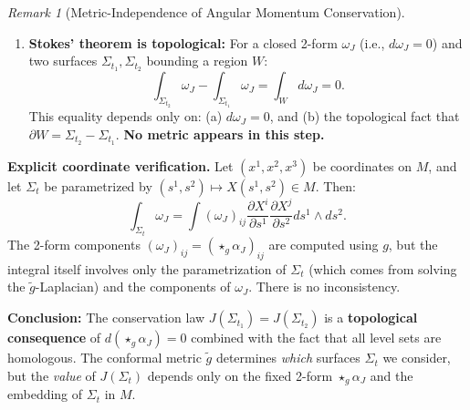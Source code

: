 \documentclass[12pt]{article}
\theoremstyle{plain}
\theoremstyle{definition}
\theoremstyle{remark}
\newtheorem{remark}[theorem]{Remark}
\begin{document}
\begin{remark}[Metric-Independence of Angular Momentum Conservation]
\begin{enumerate}
    \item \textbf{Stokes' theorem is topological:} For a closed 2-form $\omega_J$ (i.e., $d\omega_J = 0$) and two surfaces $\Sigma_{t_1}, \Sigma_{t_2}$ bounding a region $W$:
    \[
    \int_{\Sigma_{t_2}} \omega_J - \int_{\Sigma_{t_1}} \omega_J = \int_W d\omega_J = 0.
    \]
    This equality depends only on: (a) $d\omega_J = 0$, and (b) the topological fact that $\partial W = \Sigma_{t_2} - \Sigma_{t_1}$. \textbf{No metric appears in this step.}
\end{enumerate}

\textbf{Explicit coordinate verification.} Let $(x^1, x^2, x^3)$ be coordinates on $M$, and let $\Sigma_t$ be parametrized by $(s^1, s^2) \mapsto X(s^1, s^2) \in M$. Then:
\[
\int_{\Sigma_t} \omega_J = \int (\omega_J)_{ij} \frac{\partial X^i}{\partial s^1} \frac{\partial X^j}{\partial s^2} ds^1 \wedge ds^2.
\]
The 2-form components $(\omega_J)_{ij} = (\star_g \alpha_J)_{ij}$ are computed using $g$, but the integral itself involves only the parametrization of $\Sigma_t$ (which comes from solving the $\tilde{g}$-Laplacian) and the components of $\omega_J$. There is no inconsistency.

\textbf{Conclusion:} The conservation law $J(\Sigma_{t_1}) = J(\Sigma_{t_2})$ is a \textbf{topological consequence} of $d(\star_g \alpha_J) = 0$ combined with the fact that all level sets are homologous. The conformal metric $\tilde{g}$ determines \emph{which} surfaces $\Sigma_t$ we consider, but the \emph{value} of $J(\Sigma_t)$ depends only on the fixed 2-form $\star_g \alpha_J$ and the embedding of $\Sigma_t$ in $M$.
\end{remark}
\end{document}

